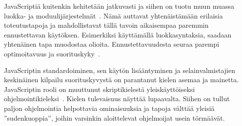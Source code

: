 JavaScriptiä kuitenkin kehitetään jatkuvasti ja siihen on tuotu muun muassa luokka- ja moduulijärjestelmät~\cite[luvut 14.5.~ja~15.2.]{es6}. Nämä auttavat yhtenäistämään erilaisia toteutustapoja ja mahdollistavat tällä tavoin aikaisempaa paremmin ennustettavan käytöksen. Esimerkiksi käyttämällä luokkasyntaksia, saadaan yhtenäinen tapa muodostaa olioita. Ennustettavuudesta seuraa parempi optimoitavuus ja suorituskyky~\cite[s.~497]{Ahn2014}.

JavaScriptin standardoiminen, sen käytön lisääntyminen ja selainvalmistajien keskinäinen kilpailu suorituskyvystä on parantanut kielen asemaa ja mainetta. JavaScriptin rooli on muuttunut skriptikielestä yleiskäyttöiseksi ohjelmointikieleksi~\cite[luku 4.]{es6}. Kielen tulevaisuus näyttää lupaavalta. Siihen on tullut paljon ohjelmointia helpottavia ominaisuuksia ja tapoja välttää yleisiä ''sudenkuoppia'', joihin varsinkin aloittelevat ohjelmoijat usein törmäävät.